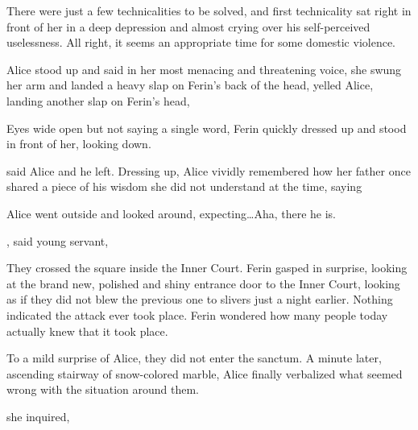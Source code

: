 There were just a few technicalities to be solved, and first technicality sat right in front of her in a deep depression and almost crying over his self-perceived uselessness. All right, it seems an appropriate time for some domestic violence. 

Alice stood up and said in her most menacing and threatening voice,  she swung her arm and landed a heavy slap on Ferin's back of the head,  yelled Alice, landing another slap on Ferin's head, 

Eyes wide open but not saying a single word, Ferin quickly dressed up and stood in front of her, looking down.

 said Alice and he left. Dressing up, Alice vividly remembered how her father once shared a piece of his wisdom she did not understand at the time, saying 

Alice went outside and looked around, expecting\dots Aha, there he is. 

, said young servant, 

They crossed the square inside the Inner Court. Ferin gasped in surprise, looking at the brand new, polished and shiny entrance door to the Inner Court, looking as if they did not blew the previous one to slivers just a night earlier. Nothing indicated the attack ever took place. Ferin wondered how many people today actually knew that it took place.

To a mild surprise of Alice, they did not enter the sanctum. A minute later, ascending stairway of snow-colored marble, Alice finally verbalized what seemed wrong with the situation around them.

 she inquired, 

